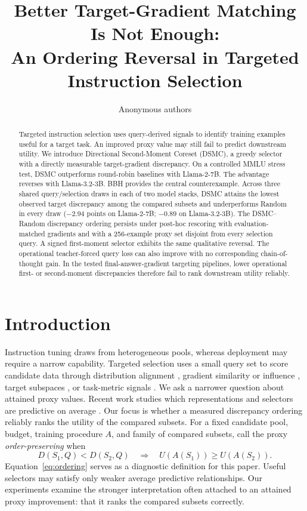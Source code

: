 \documentclass{article}
\title{Better Target-Gradient Matching Is Not Enough:\\
An Ordering Reversal in Targeted Instruction Selection}
\author{Anonymous authors}
\newcommand{\method}{\textsc{DSMC}}
\begin{document}
\maketitle

\begin{abstract}
Targeted instruction selection uses query-derived signals to identify training
examples useful for a target task. An improved proxy value may still fail to
predict downstream utility. We introduce Directional Second-Moment Coreset
(\method{}), a greedy selector with a directly measurable target-gradient
discrepancy. On a controlled MMLU stress test, \method{} outperforms
round-robin baselines with Llama-2-7B. The advantage reverses with
Llama-3.2-3B. BBH provides the central counterexample. Across three shared
query/selection draws in each of two model stacks, \method{} attains the lowest
observed target discrepancy among the compared subsets and underperforms
Random in every draw ($-2.94$ points on Llama-2-7B; $-0.89$ on
Llama-3.2-3B). The \method{}--Random discrepancy ordering persists under
post-hoc rescoring with evaluation-matched gradients and with a 256-example
proxy set disjoint from every selection query. A signed first-moment selector
exhibits the same qualitative reversal. The operational teacher-forced query
loss can also improve with no corresponding chain-of-thought gain. In the
tested final-answer-gradient targeting pipelines, lower operational first- or
second-moment discrepancies therefore fail to rank downstream utility
reliably.
\end{abstract}

\section{Introduction}
\label{sec:intro}

Instruction tuning \citep{wei2022finetuned} draws from heterogeneous pools,
whereas deployment may require a narrow capability. Targeted selection uses a
small query set to score candidate data through distribution alignment
\citep{liu2024tsds}, gradient similarity or influence
\citep{xia2024less,wang2025nice}, target subspaces \citep{min2026gist}, or
task-metric signals \citep{wang2025nice,wu2025rose}. We ask a narrower question
about attained proxy values. Recent work studies which representations and
selectors are predictive on average \citep{nayak2026critical}. Our focus is
whether a measured discrepancy ordering reliably ranks the utility of the
compared subsets.
For a fixed candidate pool, budget, training procedure $A$, and family of
compared subsets, call the proxy \emph{order-preserving} when
\begin{equation}
    D(S_1,Q)<D(S_2,Q)
    \quad\Longrightarrow\quad
    U(A(S_1))\ge U(A(S_2)).
    \label{eq:ordering}
\end{equation}
Equation~\ref{eq:ordering} serves as a diagnostic definition for this paper.
Useful selectors may satisfy only weaker average predictive relationships. Our
experiments examine the stronger interpretation often attached to an attained
proxy improvement: that it ranks the compared subsets correctly.
\end{document}
